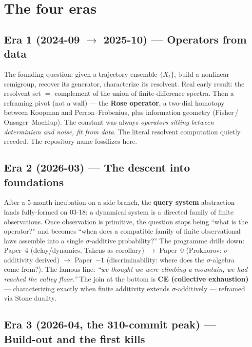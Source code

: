 \documentclass[11pt]{article}
\begin{document}
\section{The four eras}

\subsection{Era 1 (2024-09 $\to$ 2025-10) --- Operators from data}

The founding question: given a trajectory ensemble $\{X_t\}$, build a nonlinear
semigroup, recover its generator, characterize its resolvent. Real early result:
the resolvent set $=$ complement of the union of finite-difference spectra. Then
a reframing pivot (not a wall) --- the \textbf{Rose operator}, a two-dial
homotopy between Koopman and Perron--Frobenius, plus information geometry
(Fisher\,/\,Onsager--Machlup). The constant was always \emph{operators sitting
between determinism and noise, fit from data}. The literal resolvent computation
quietly receded. The repository name fossilizes here.

\subsection{Era 2 (2026-03) --- The descent into foundations}

After a 5-month incubation on a side branch, the \textbf{query system}
abstraction lands fully-formed on 03-18: a dynamical system is a directed family
of finite observations. Once observation is primitive, the question stops being
``what is the operator?'' and becomes ``when does a compatible family of finite
observational laws assemble into a single $\sigma$-additive probability?'' The
programme drills down: Paper~4 (delay/dynamics, Takens as corollary) $\to$
Paper~0 (Prokhorov: $\sigma$-additivity derived) $\to$ Paper~$-1$
(discriminability: where does the $\sigma$-algebra come from?). The famous line:
\emph{``we thought we were climbing a mountain; we had reached the valley
floor.''} The join at the bottom is \textbf{CE (collective exhaustion)} ---
characterizing exactly when finite additivity extends $\sigma$-additively ---
reframed via Stone duality.

\subsection{Era 3 (2026-04, the 310-commit peak) --- Build-out and the first kills}
\end{document}
